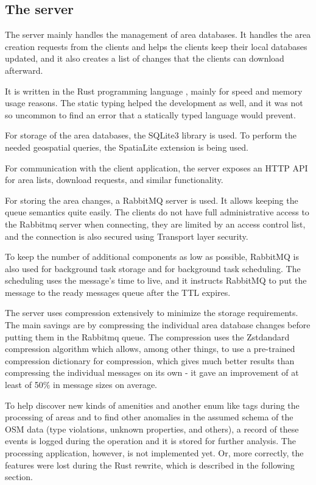 \documentclass[nolof,digital]{fithesis3}
\begin{document}
\subsection{The server}
The server mainly handles the management of area databases. It handles the area creation requests from the clients and helps the clients keep their local databases updated, and it also creates a list of changes that the clients can download afterward.

It is written in the Rust programming language \parencite{rust}, mainly for speed and memory usage reasons. The static typing helped the development as well, and it was not so uncommon to find an error that a statically typed language would prevent.

For storage of the area databases, the SQLite3 library \parencite{sqlite} is used. To perform the needed geospatial queries, the SpatiaLite extension \parencite{spatialite} is being used.

For communication with the client application, the server exposes an HTTP API for area lists, download requests, and similar functionality. 

For storing the area changes, a RabbitMQ \parencite{rabbitmq} server is used. It allows keeping the queue semantics quite easily. The clients do not have full administrative access to the Rabbitmq server when connecting, they are limited by an access control list, and the connection is also secured using Transport layer security.

To keep the number of additional components as low as possible, RabbitMQ is also used for background task storage and for background task scheduling. The scheduling uses the message's time to live, and it instructs RabbitMQ to put the message to the ready messages queue after the TTL expires.

The server uses compression extensively to minimize the storage requirements. The main savings are by compressing the individual area database changes before putting them in the Rabbitmq queue. The compression uses the Zstdandard compression algorithm \parencite{zstd} which allows, among other things, to use a pre-trained compression dictionary for compression, which gives much better results than compressing the individual messages on its own - it gave an improvement of at least of 50\% in message sizes on average.

To help discover new kinds of amenities and another enum like tags during the processing of areas and to find other anomalies in the assumed schema of the OSM data (type violations, unknown properties, and others), a record of these events is logged during the operation and it is stored for further analysis. The processing application, however, is not implemented yet. Or, more correctly, the features were lost during the Rust rewrite, which is described in the following section.
\end{document}
